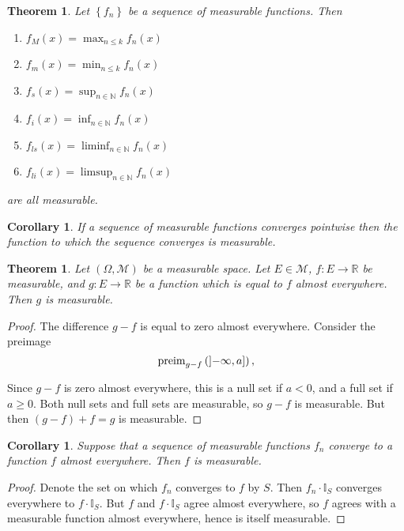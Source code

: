 \documentclass[a4paper,12pt]{scrreprt}
\newcommand{\R}{\mathbb{R}}
\newcommand{\N}{\mathbb{N}}
\theoremstyle{definition}
\theoremstyle{plain}
\newtheorem{theorem}[definition]{Theorem}
\newtheorem{corollary}[definition]{Corollary}
\theoremstyle{remark}
\begin{document}
\begin{theorem}
  \label{thm:limitsoffunctionsaremeasurable}
  Let $\left\{ f_{n} \right\}$ be a sequence of measurable functions. Then
  \begin{enumerate}
    \item $f_{M}(x) = \max_{n \leq k} f_{n}(x)$

    \item $f_{m}(x) = \min_{n \leq k} f_{n}(x)$

    \item $f_{s}(x) = \sup_{n \in \N} f_{n}(x)$

    \item $f_{i}(x) = \inf_{n \in \N} f_{n}(x)$

    \item $f_{ls}(x) = \liminf_{n \in \N} f_{n}(x)$

    \item $f_{li}(x) = \limsup_{n \in \N} f_{n}(x)$
  \end{enumerate}
  are all measurable.
\end{theorem}

\begin{corollary}
  If a sequence of measurable functions converges pointwise then the function to which the sequence converges is measurable.
\end{corollary}

\begin{theorem}
  Let $(\Omega, \mathcal{M})$ be a measurable space. Let $E \in \mathcal{M}$, $f\colon E \to \R$ be measurable, and $g\colon E \to \R$ be a function which is equal to $f$ almost everywhere. Then $g$ is measurable.
\end{theorem}
\begin{proof}
  The difference $g - f$ is equal to zero almost everywhere. Consider the preimage
  \begin{equation*}
  \mathrm{preim}_{g-f}\left( \interval[open left]{-\infty}{a} \right),
\end{equation*}

Since $g - f$ is zero almost everywhere, this is a null set if $a < 0$, and a full set if $a \geq 0$. Both null sets and full sets are measurable, so $g - f$ is measurable. But then $(g - f) + f = g$ is measurable.
\end{proof}

\begin{corollary}
  Suppose that a sequence of measurable functions $f_{n}$ converge to a function $f$ almost everywhere. Then $f$ is measurable.
\end{corollary}
\begin{proof}
  Denote the set on which $f_{n}$ converges to $f$ by $S$. Then $f_{n}\cdot\mathbb{I}_{S}$ converges everywhere to $f\cdot\mathbb{I}_{S}$. But $f$ and $f\cdot \mathbb{I}_{S}$ agree almost everywhere, so $f$ agrees with a measurable function almost everywhere, hence is itself measurable.
\end{proof}
\end{document}
